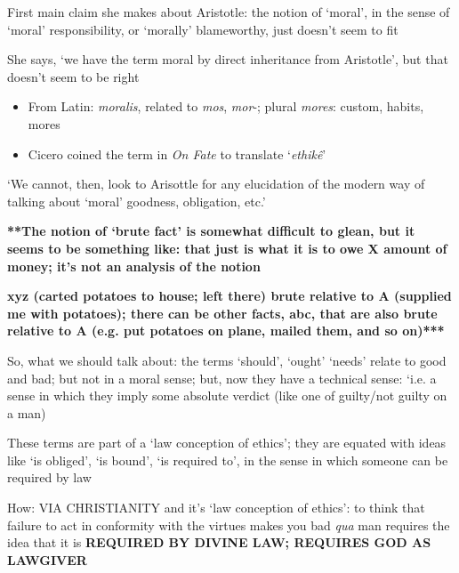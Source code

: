 \documentclass[11pt]{article}
\begin{document}
\noindent First main claim she makes about Aristotle: the notion of `moral', in the sense of `moral' responsibility, or `morally' blameworthy, just doesn't seem to fit
\vspace*{2mm}

\noindent She says, `we have the term moral by direct inheritance from Aristotle', but that doesn't seem to be right

\begin{itemize}\item{From Latin: \emph{moralis}, related to \emph{mos}, \emph{mor}-; plural \emph{mores}: custom, habits, mores}\item{Cicero coined the term in \emph{On Fate} to translate `\emph{ethik\^{e}}'}\end{itemize}

\noindent `We cannot, then, look to Arisottle for any elucidation of the modern way of talking about `moral' goodness, obligation, etc.'
\vspace*{2mm}

\textbf{\noindent ***The notion of `brute fact' is somewhat difficult to glean, but it seems to be something like: that just is what it is to owe X amount of money; it's not an analysis of the notion}
\vspace*{2mm}

\noindent\textbf{xyz (carted potatoes to house; left there) brute relative to A (supplied me with potatoes); there can be other facts, abc, that are also brute relative to A (e.g. put potatoes on plane, mailed them, and so on)***}
\vspace*{2mm}

\noindent So, what we should talk about: the terms `should', `ought' `needs' relate to good and bad; but not in a moral sense; but, now they have a technical sense: `i.e. a sense in which they imply some absolute verdict (like one of guilty/not guilty on a man)
\vspace*{2mm}

\noindent These terms are part of a `law conception of ethics'; they are equated with ideas like `is obliged', `is bound', `is required to', in the sense in which someone can be required by law
\vspace*{2mm}

\noindent How: VIA CHRISTIANITY and it's `law conception of ethics': to think that failure to act in conformity with the virtues makes you bad \emph{qua} man requires the idea that it is \textbf{REQUIRED BY DIVINE LAW; REQUIRES GOD AS LAWGIVER}
\vspace*{2mm}
\end{document}
